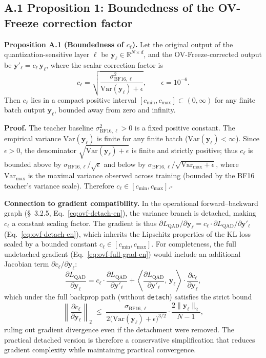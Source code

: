 \documentclass[11pt, a4paper]{article}
\begin{document}
\subsection*{A.1 Proposition 1: Boundedness of the OV-Freeze correction factor}

\noindent\textbf{Proposition A.1 (Boundedness of $c_\ell$).} Let the original output of the quantization-sensitive layer $\ell$ be $\bm{y}_\ell\in\mathbb{R}^{N\times d}$, and the OV-Freeze-corrected output be $\bm{y}'_\ell = c_\ell\,\bm{y}_\ell$, where the scalar correction factor is
\[
c_\ell = \sqrt{\frac{\sigma^2_{\mathrm{BF16},\ell}}{\mathrm{Var}(\bm{y}_\ell)+\epsilon}},\qquad \epsilon = 10^{-6}.
\]
Then $c_\ell$ lies in a compact positive interval $[c_{\min}, c_{\max}] \subset (0, \infty)$ for any finite batch output $\bm{y}_\ell$, bounded away from zero and infinity.

\noindent\textbf{Proof.} The teacher baseline $\sigma^2_{\mathrm{BF16},\ell}>0$ is a fixed positive constant. The empirical variance $\mathrm{Var}(\bm{y}_\ell)$ is finite for any finite batch ($\mathrm{Var}(\bm{y}_\ell) < \infty$). Since $\epsilon>0$, the denominator $\sqrt{\mathrm{Var}(\bm{y}_\ell)+\epsilon}$ is finite and strictly positive; thus $c_\ell$ is bounded above by $\sigma_{\mathrm{BF16},\ell}/\sqrt{\epsilon}$ and below by $\sigma_{\mathrm{BF16},\ell}/\sqrt{\mathrm{Var}_{\max}+\epsilon}$, where $\mathrm{Var}_{\max}$ is the maximal variance observed across training (bounded by the BF16 teacher's variance scale). Therefore $c_\ell \in [c_{\min}, c_{\max}]$.\hfill$\square$

\medskip
\noindent\textbf{Connection to gradient compatibility.} In the operational forward--backward graph (\S~3.2.5, Eq.~\eqref{eq:ovf-detach-en}), the variance branch is detached, making $c_\ell$ a constant scaling factor. The gradient is thus $\partial L_{\mathrm{QAD}} / \partial \bm{y}_\ell = c_\ell \cdot \partial L_{\mathrm{QAD}} / \partial \bm{y}'_\ell$ (Eq.~\eqref{eq:ovf-detach-en}), which inherits the Lipschitz properties of the KL loss scaled by a bounded constant $c_\ell \in [c_{\min}, c_{\max}]$. For completeness, the full undetached gradient (Eq.~\eqref{eq:ovf-full-grad-en}) would include an additional Jacobian term $\partial c_\ell / \partial \bm{y}_\ell$:
\[
\frac{\partial L_{\mathrm{QAD}}}{\partial\bm{y}_\ell} = c_\ell\cdot\frac{\partial L_{\mathrm{QAD}}}{\partial\bm{y}'_\ell} + \left\langle\frac{\partial L_{\mathrm{QAD}}}{\partial\bm{y}'_\ell},\,\bm{y}_\ell\right\rangle\cdot\frac{\partial c_\ell}{\partial\bm{y}_\ell},
\]
which under the full backprop path (without \texttt{detach}) satisfies the strict bound
\[
\left\|\frac{\partial c_\ell}{\partial \bm{y}_\ell}\right\|_2 \;\le\; \frac{\sigma_{\mathrm{BF16},\ell}}{2\bigl(\mathrm{Var}(\bm{y}_\ell)+\epsilon\bigr)^{3/2}}\cdot\frac{2\|\bm{y}_\ell\|_2}{N-1},
\]
ruling out gradient divergence even if the detachment were removed. The practical detached version is therefore a conservative simplification that reduces gradient complexity while maintaining practical convergence.
\end{document}

